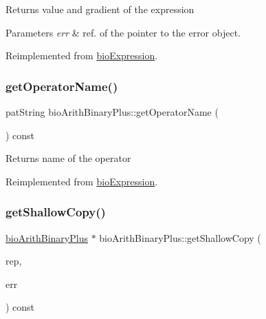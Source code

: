 \begin{DoxyReturn}{Returns}
value and gradient of the expression 
\end{DoxyReturn}

\begin{DoxyParams}{Parameters}
{\em err} & ref. of the pointer to the error object. \\
\hline
\end{DoxyParams}


Reimplemented from \hyperlink{classbio_expression_a91c81ce80c9e972c913b10f5f3c1ed13}{bio\+Expression}.

\mbox{\label{classbio_arith_binary_plus_a1d9032fda00f9f0d00f3244714c35cdb}} 
\subsubsection{\texorpdfstring{get\+Operator\+Name()}{getOperatorName()}}
{\footnotesize\ttfamily pat\+String bio\+Arith\+Binary\+Plus\+::get\+Operator\+Name (\begin{DoxyParamCaption}{ }\end{DoxyParamCaption}) const\hspace{0.3cm}{\ttfamily [virtual]}}

\begin{DoxyReturn}{Returns}
name of the operator 
\end{DoxyReturn}


Reimplemented from \hyperlink{classbio_expression_a2353a4afb3a2b0af7c63aba086a72bde}{bio\+Expression}.

\mbox{\label{classbio_arith_binary_plus_a4e2587ad009e65821632b18d0253ff4c}} 
\subsubsection{\texorpdfstring{get\+Shallow\+Copy()}{getShallowCopy()}}
{\footnotesize\ttfamily \hyperlink{classbio_arith_binary_plus}{bio\+Arith\+Binary\+Plus} $\ast$ bio\+Arith\+Binary\+Plus\+::get\+Shallow\+Copy (\begin{DoxyParamCaption}\item[{\hyperlink{classbio_expression_repository}{bio\+Expression\+Repository} $\ast$}]{rep,  }\item[{pat\+Error $\ast$\&}]{err }\end{DoxyParamCaption}) const\hspace{0.3cm}{\ttfamily [virtual]}}

